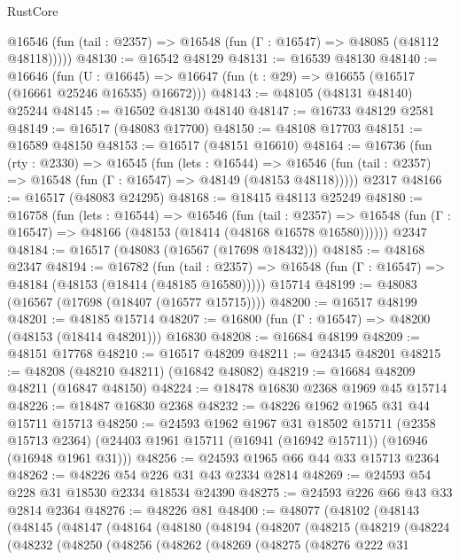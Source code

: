 \begin{lexlean}{RustCore}
\begin{coremodule}
      @16546 (fun (tail : @2357) => @16548 (fun (Γ : @16547) => @48085 (@48112 @48118)))))
@48130 := @16542 @48129
@48131 := @16539 @48130
@48140 := @16646
    (fun (U : @16645) => @16647 (fun (t : @29) => @16655 (@16517 (@16661 @25246 @16535) @16672)))
@48143 := @48105 (@48131 @48140) @25244
@48145 := @16502 @48130 @48140
@48147 := @16733 @48129 @2581
@48149 := @16517 (@48083 @17700)
@48150 := @48108 @17703
@48151 := @16589 @48150
@48153 := @16517 (@48151 @16610)
@48164 := @16736
    (fun (rty : @2330) =>
    @16545
      (fun (lets : @16544) =>
      @16546 (fun (tail : @2357) => @16548 (fun (Γ : @16547) => @48149 (@48153 @48118)))))
    @2317
@48166 := @16517 (@48083 @24295)
@48168 := @18415 @48113 @25249
@48180 := @16758
    (fun (lets : @16544) =>
    @16546
      (fun (tail : @2357) =>
      @16548 (fun (Γ : @16547) => @48166 (@48153 (@18414 (@48168 @16578 @16580))))))
    @2347
@48184 := @16517 (@48083 (@16567 (@17698 @18432)))
@48185 := @48168 @2347
@48194 := @16782
    (fun (tail : @2357) => @16548 (fun (Γ : @16547) => @48184 (@48153 (@18414 (@48185 @16580)))))
    @15714
@48199 := @48083 (@16567 (@17698 (@18407 (@16577 @15715))))
@48200 := @16517 @48199
@48201 := @48185 @15714
@48207 := @16800 (fun (Γ : @16547) => @48200 (@48153 (@18414 @48201))) @16830
@48208 := @16684 @48199
@48209 := @48151 @17768
@48210 := @16517 @48209
@48211 := @24345 @48201
@48215 := @48208 (@48210 @48211) (@16842 @48082)
@48219 := @16684 @48209 @48211 (@16847 @48150)
@48224 := @18478 @16830 @2368 @1969 @45 @15714
@48226 := @18487 @16830 @2368
@48232 := @48226 @1962 @1965 @31 @44 @15711 @15713
@48250 := @24593
    @1962
    @1967
    @31
    @18502
    @15711
    (@2358 @15713 @2364)
    (@24403 @1961 @15711 (@16941 (@16942 @15711)) (@16946 (@16948 @1961 @31)))
@48256 := @24593 @1965 @66 @44 @33 @15713 @2364
@48262 := @48226 @54 @226 @31 @43 @2334 @2814
@48269 := @24593 @54 @228 @31 @18530 @2334 @18534 @24390
@48275 := @24593 @226 @66 @43 @33 @2814 @2364
@48276 := @48226 @81
@48400 := @48077
    (@48102
      (@48143
        (@48145
          (@48147
            (@48164
              (@48180
                (@48194
                  (@48207
                    (@48215
                      (@48219
                        (@48224
                          (@48232
                            (@48250
                              (@48256
                                (@48262
                                  (@48269
                                    (@48275
                                      (@48276
                                        @222
                                        @31

\end{coremodule}
\end{lexlean}
